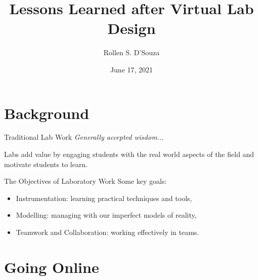 \documentclass{beamer}
\title[Lessons Learned after Virtual Lab Design]{%
  Lessons Learned after Virtual Lab Design
}
\author[R. S. D'Souza --- rollen.dsouza@uwaterloo.ca]{%
  Rollen S. D'Souza
}
\date{June 17, 2021}
\begin{document}
\frame{\titlepage}

\section{Background}

\begin{frame}{Traditional Lab Work}
  \emph{Generally accepted wisdom...}
  \begin{center}
    Labs add value by engaging students with the real world aspects of the field and motivate students to learn.
  \end{center}
\end{frame}

\begin{frame}{The Objectives of Laboratory Work}
  Some key goals:~\cite{Feisel2005}
  \begin{itemize}
    \item{
      Instrumentation: learning practical techniques and tools,
    } \pause
    \item{
      Modelling: managing with our imperfect models of reality,
    } \pause
    \item{
      Teamwork and Collaboration: working effectively in teams.
    }
  \end{itemize}
\end{frame}

\section{Going Online}

\end{document}
